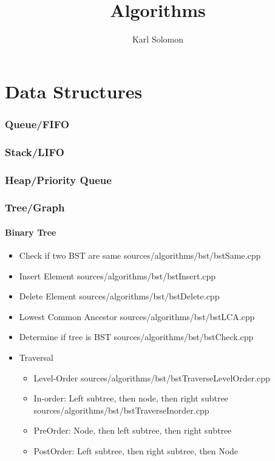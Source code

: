 \documentclass{article}
\begin{document}
\selectfont
\title{Algorithms}
\author{Karl Solomon}
\maketitle
\tableofcontents
\newpage
\part{Data Structures}
    \section{Queue/FIFO}
    \section{Stack/LIFO}
    \section{Heap/Priority Queue}
    \section{Tree/Graph}
        \subsection{Binary Tree}
          \begin{itemize}
            \item Check if two BST are same
               {sources/algorithms/bst/bstSame.cpp}
            \item Insert Element
               {sources/algorithms/bst/bstInsert.cpp}
            \item Delete Element
               {sources/algorithms/bst/bstDelete.cpp}
            \item Lowest Common Ancestor
               {sources/algorithms/bst/bstLCA.cpp}
            \item Determine if tree is BST
               {sources/algorithms/bst/bstCheck.cpp}
            \item Traversal
              \begin{itemize}
                \item Level-Order
                   {sources/algorithms/bst/bstTraverseLevelOrder.cpp}
                \item In-order: Left subtree, then node, then right subtree
                   {sources/algorithms/bst/bstTraverseInorder.cpp}
                \item PreOrder: Node, then left subtree, then right subtree
                \item PostOrder: Left subtree, then right subtree, then Node
              \end{itemize}
          \end{itemize}
\end{document}
